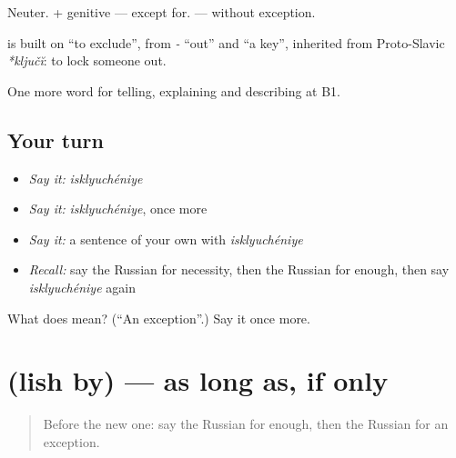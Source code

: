 Neuter. \emph{ } + genitive — except for. \emph{ } — without exception.

\begin{cousinweb}
\textbf{} is built on \emph{} \textquotedblleft{}to exclude\textquotedblright{}, from \emph{-} \textquotedblleft{}out\textquotedblright{} and \emph{} \textquotedblleft{}a key\textquotedblright{}, inherited from Proto-Slavic \emph{*ključĭ}: to lock someone out.
\end{cousinweb}

\begin{grammarlens}[title={What you've built}]
One more word for telling, explaining and describing at B1.
\end{grammarlens}

\subsection*{Your turn}
\begin{itemize}
\raggedright
  \item \emph{Say it:} \emph{isklyuchéniye}
  \item \emph{Say it:} \emph{isklyuchéniye}, once more
  \item \emph{Say it:} a sentence of your own with \emph{isklyuchéniye}
  \item \emph{Recall:} say the Russian for necessity, then the Russian for enough, then say \emph{isklyuchéniye} again
\end{itemize}

\begin{tcolorbox}[breakable,colback=teal!4,colframe=teal!35!black,title={Before you move on}]
What does  mean? (\textquotedblleft{}An exception\textquotedblright{}.) Say it once more.
\end{tcolorbox}
\section[\texorpdfstring{\ru{лишь} \ru{бы} (lish by)}{лишь бы (lish by)}]{  (lish by) — as long as, if only}

\label{lesson:RU-C376-lish-by}



\begin{quote}
Before the new one: say the Russian for enough, then the Russian for an exception.
\end{quote}

